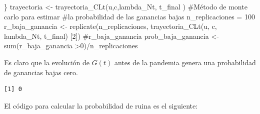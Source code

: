 \documentclass[
  us-letterpaper,
]{scrreprt}
\newenvironment{Shaded}{\begin{snugshade}}{\end{snugshade}}
\newcommand{\CommentTok}[1]{\textcolor[rgb]{0.37,0.37,0.37}{#1}}
\newcommand{\DecValTok}[1]{\textcolor[rgb]{0.68,0.00,0.00}{#1}}
\newcommand{\FunctionTok}[1]{\textcolor[rgb]{0.28,0.35,0.67}{#1}}
\newcommand{\NormalTok}[1]{\textcolor[rgb]{0.00,0.23,0.31}{#1}}
\newcommand{\OtherTok}[1]{\textcolor[rgb]{0.00,0.23,0.31}{#1}}
\newcommand{\SpecialCharTok}[1]{\textcolor[rgb]{0.37,0.37,0.37}{#1}}
\theoremstyle{definition}
\theoremstyle{plain}
\theoremstyle{plain}
\theoremstyle{remark}
\begin{document}
\begin{Shaded}
\begin{Highlighting}[]
\NormalTok{\}}
\NormalTok{trayectoria }\OtherTok{\textless{}{-}} \FunctionTok{trayectoria\_CLt}\NormalTok{(u,c,lambda\_Nt, t\_final )}
\CommentTok{\#Método de monte carlo para estimar }
\CommentTok{\#la probabilidad de las ganancias bajas}
\NormalTok{n\_replicaciones }\OtherTok{=} \DecValTok{100}
\NormalTok{r\_baja\_ganancia }\OtherTok{\textless{}{-}} \FunctionTok{replicate}\NormalTok{(n\_replicaciones,}
\FunctionTok{trayectoria\_CLt}\NormalTok{(u, c, lambda\_Nt, t\_final)}
\NormalTok{[}\DecValTok{2}\NormalTok{])}
\CommentTok{\#r\_baja\_ganancia }
\NormalTok{prob\_baja\_ganancia }\OtherTok{\textless{}{-}} \FunctionTok{sum}\NormalTok{(r\_baja\_ganancia }\SpecialCharTok{\textgreater{}}\DecValTok{0}\NormalTok{)}\SpecialCharTok{/}\NormalTok{n\_replicaciones}
\end{Highlighting}
\end{Shaded}

Es claro que la evolución de \(G(t)\) antes de la pandemia genera una
probabilidad de ganancias bajas cero.

\begin{verbatim}
[1] 0
\end{verbatim}

El código para calcular la probabilidad de ruina es el siguiente:
\end{document}
